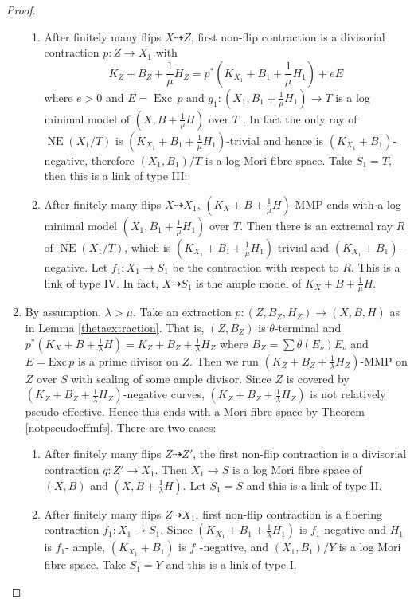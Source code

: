 \documentclass{article}
\begin{document}
\begin{proof}
\begin{enumerate}
\begin{enumerate}
    \item \label{a3}
      After finitely many flips $ X\dashrightarrow Z $, first non-flip contraction is a divisorial contraction $ p:Z\to X_1$ with 
    \[ K_Z+B_Z+\frac{1}{\mu}H_Z=p^*(K_{X_1}+B_1+\frac{1}{\mu}H_1)+eE \]
    where $ e>0 $ and  $E=\operatorname{Exc}\,p$ and  $g_{1}: (X_1,B_1+\frac{1}{\mu}H_1) \to T$ is a log minimal model of $(X,B+\frac{1}{\mu}H)$ over $T$ . In fact the only ray of $ \overline{\operatorname{NE}}(X_1/T) $ is $ (K_{X_1}+B_1+\frac{1}{\mu}H_1) $-trivial and hence is $ (K_{X_1}+B_1) $-negative, therefore $ (X_1,B_1)/T $ is a log Mori fibre space. Take $ S_1=T $, then this is a link of type III:
  \item \label{a4}After finitely many flips $ X\dashrightarrow X_1 $, $(K_{X}+B+\frac{1}{\mu}H)$-MMP ends with a log minimal model $ (X_1,B_1+\frac{1}{\mu}H_1) $ over $T $. Then there is an extremal ray $R$ of $ \overline{\operatorname{NE}}(X_1/T) $, which is $ (K_{X_1}+B_1+\frac{1}{\mu}H_1) $-trivial and $ (K_{X_1}+B_1) $-negative. Let $ f_1:X_1\to S_1 $ be the contraction with respect to $R$. This is a link of type IV. In fact, $X \dashrightarrow  S_{1}$ is the ample model of $K_{X}+B+\frac{1}{\mu}H$.
  \end{enumerate}
\item\label{b}By assumption, $\lambda>\mu$. Take  an extraction $ p:(Z,B_Z,H_Z)\to (X,B,H) $ as in Lemma \ref{thetaextraction}. That is,  $ (Z,B_Z) $ is $ \theta $-terminal and $ p^*(K_X+B+\frac{1}{\lambda}H)=K_Z+B_Z+\frac{1}{\lambda}H_Z $ where $ B_Z=\sum\theta(E_\nu)E_\nu $ and $ E=\mathrm{Exc}\,p $ is a prime divisor on $ Z $.
  Then we run $ (K_Z+B_Z+\frac{1}{\lambda}H_Z) $-MMP on $ Z $ over $ S $ with scaling of some ample divisor. Since $Z$ is covered by $ (K_Z+B_Z+\frac{1}{\lambda}H_Z) $-negative curves, $ (K_Z+B_Z+\frac{1}{\lambda}H_Z) $ is not relatively pseudo-effective. Hence this  ends with a Mori fibre space by Theorem \ref{notpseudoeffmfs}. There are two cases:
  \begin{enumerate}
    \item \label{b1}After finitely many flips $ Z\dashrightarrow Z' $, the first non-flip contraction is a divisorial contraction $ q:Z'\to X_1 $. Then $ X_{1}\to S $ is a log Mori fibre space of $(X,B)$ and $(X,B+\frac{1}{\lambda}H)$.  Let $ S_1=S $ and this is a link of type II.
    \item\label{b2}After finitely many flips $ Z\dashrightarrow X_1 $, first non-flip contraction is a fibering contraction $ f_1:X_1\to S_{1}$. Since $ (K_{X_1}+B_1+\frac{1}{\lambda}H_1) $ is $ f_1 $-negative and $ H_1 $ is $ f_1 $- ample, $ (K_{X_1}+B_1) $ is $ f_1 $-negative, and $ (X_1,B_1)/Y $ is a log Mori fibre space.  Take $ S_1=Y $ and this is a link of type I.
  \end{enumerate} 
\end{enumerate}
\end{proof}
\end{document}
